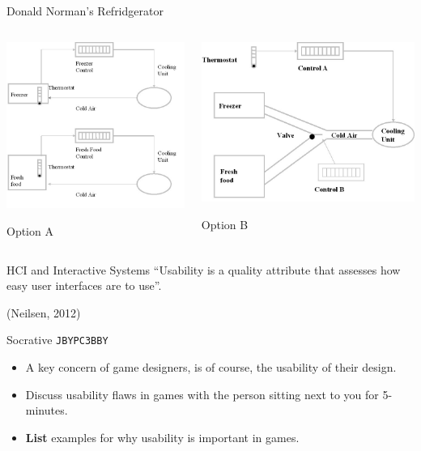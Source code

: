 \begin{frame}{Donald Norman's Refridgerator}
	\begin{columns}[onlytextwidth]
		\begin{column}{0.45\textwidth}
			\includegraphics[height=20ex]{norman_fridge_mental_model.jpg}
			
			Option A
		\end{column}
		\begin{column}{0.45\textwidth}
			\includegraphics[height=20ex]{norman_fridge_actual_design.jpg}
			
			Option B
		\end{column}
	\end{columns}
\end{frame}

\begin{frame}{HCI and Interactive Systems}
	``Usability is a quality attribute that assesses how easy user interfaces are to use''.
	
	\vspace{2ex}
	
	(Neilsen, 2012)
\end{frame}

\begin{frame}[fragile]{Socrative \texttt{JBYPC3BBY}}
	\begin{itemize}
		\item A key concern of game designers, is of course, the usability of their design. 
		\item Discuss usability flaws in games with the person sitting next to you for 5-minutes.
		\item \textbf{List} examples for why usability is important in games.
	\end{itemize}
\end{frame}

